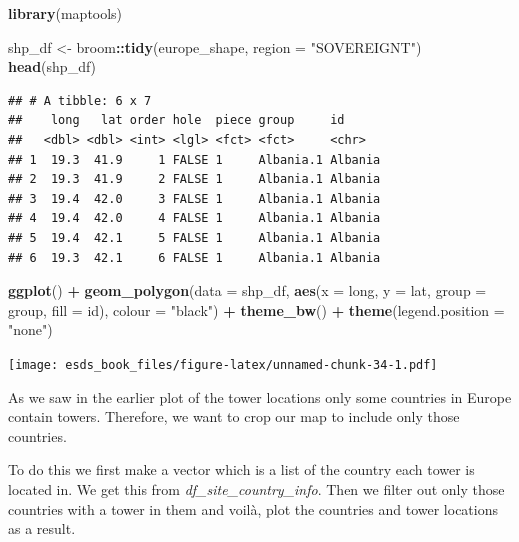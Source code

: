 \documentclass[
]{book}
\newenvironment{Shaded}{\begin{snugshade}}{\end{snugshade}}
\newcommand{\DataTypeTok}[1]{\textcolor[rgb]{0.13,0.29,0.53}{#1}}
\newcommand{\KeywordTok}[1]{\textcolor[rgb]{0.13,0.29,0.53}{\textbf{#1}}}
\newcommand{\NormalTok}[1]{#1}
\newcommand{\OperatorTok}[1]{\textcolor[rgb]{0.81,0.36,0.00}{\textbf{#1}}}
\newcommand{\StringTok}[1]{\textcolor[rgb]{0.31,0.60,0.02}{#1}}
\begin{document}
\begin{Shaded}
\begin{Highlighting}[]
\KeywordTok{library}\NormalTok{(maptools)}

\NormalTok{shp_df <-}\StringTok{ }\NormalTok{broom}\OperatorTok{::}\KeywordTok{tidy}\NormalTok{(europe_shape, }\DataTypeTok{region =} \StringTok{"SOVEREIGNT"}\NormalTok{)}
\KeywordTok{head}\NormalTok{(shp_df)}
\end{Highlighting}
\end{Shaded}

\begin{verbatim}
## # A tibble: 6 x 7
##    long   lat order hole  piece group     id     
##   <dbl> <dbl> <int> <lgl> <fct> <fct>     <chr>  
## 1  19.3  41.9     1 FALSE 1     Albania.1 Albania
## 2  19.3  41.9     2 FALSE 1     Albania.1 Albania
## 3  19.4  42.0     3 FALSE 1     Albania.1 Albania
## 4  19.4  42.0     4 FALSE 1     Albania.1 Albania
## 5  19.4  42.1     5 FALSE 1     Albania.1 Albania
## 6  19.3  42.1     6 FALSE 1     Albania.1 Albania
\end{verbatim}

\begin{Shaded}
\begin{Highlighting}[]
\KeywordTok{ggplot}\NormalTok{() }\OperatorTok{+}\StringTok{ }
\StringTok{  }\KeywordTok{geom_polygon}\NormalTok{(}\DataTypeTok{data =}\NormalTok{ shp_df, }\KeywordTok{aes}\NormalTok{(}\DataTypeTok{x =}\NormalTok{ long, }\DataTypeTok{y =}\NormalTok{ lat, }\DataTypeTok{group =}\NormalTok{ group, }\DataTypeTok{fill =}\NormalTok{ id), }\DataTypeTok{colour =} \StringTok{"black"}\NormalTok{) }\OperatorTok{+}
\StringTok{  }\KeywordTok{theme_bw}\NormalTok{() }\OperatorTok{+}
\StringTok{  }\KeywordTok{theme}\NormalTok{(}\DataTypeTok{legend.position =} \StringTok{"none"}\NormalTok{)}
\end{Highlighting}
\end{Shaded}

\texttt{[image: esds\_book\_files/figure-latex/unnamed-chunk-34-1.pdf]}

As we saw in the earlier plot of the tower locations only some countries in Europe contain towers. Therefore, we want to crop our map to include only those countries.

To do this we first make a vector which is a list of the country each tower is located in. We get this from \emph{df\_site\_country\_info}.
Then we filter out only those countries with a tower in them and voilà, plot the countries and tower locations as a result.
\end{document}
